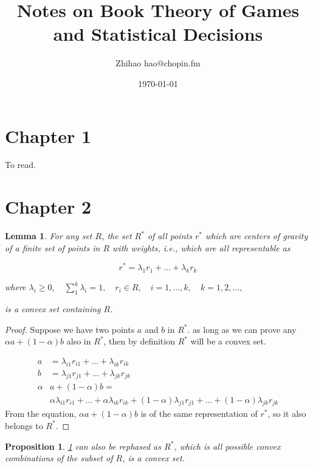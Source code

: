 \documentclass{article}
\title{Notes on Book Theory of Games and Statistical Decisions}
\author{Zhihao hao@chopin.fm}
\date{\today}
\newtheorem{proposition}{Proposition}[section]
\newtheorem{lemma}[theorem]{Lemma}
\begin{document}
\maketitle
\section{Chapter 1}
To read.

\section{Chapter 2}

\begin{lemma} \label{lem1}
For any set $R$, the set $R^{*}$ of all points $r^{*}$ which are centers of gravity of a finite set of points in $R$ with weights, i.e., which are all representable as

\begin{equation}
 r^{*} = \lambda_{1}r_{1} + ... + \lambda_{k}r_{k}
\end{equation}

where $\lambda_i \geq 0,\quad \sum_{1}^{k}\lambda_i = 1, \quad r_i \in R, \quad i = 1 , ..., k, \quad k = 1, 2, ...,$

is a convex set containing $R$.
\end{lemma}

\begin{proof}
    Suppose we have two points $a$ and $b$ in $R^*$. as long as we can prove any $\alpha{}a + (1 -\alpha)b$ also in $R^*$, then by definition $R^*$ will be a convex set.

    \begin{align*}
        a & = \lambda_{i1}r_{i1} + ... + \lambda_{ik}r_{ik} \\
        b & = \lambda_{j1}r_{j1} + ... + \lambda_{jk}r_{jk} \\
        \alpha{} & a + (1 -\alpha)b = \\
            & \alpha{}\lambda_{i1}r_{i1} + ... + \alpha{}\lambda_{ik}r_{ik} + (1 -\alpha)\lambda_{j1}r_{j1} + ... + (1 -\alpha)\lambda_{jk}r_{jk}
    \end{align*}
    From the equation, $\alpha{}a + (1 -\alpha)b$ is of the same representation of $r^{*}$, so it also belongs to $R^{*}$.

\end{proof}

\begin{proposition} \label{prop1}
    \cref{lem1} can also be rephased as $R^*$, which is all possible convex combinations of the subset of $R$, is a convex set.
\end{proposition}
\end{document}
